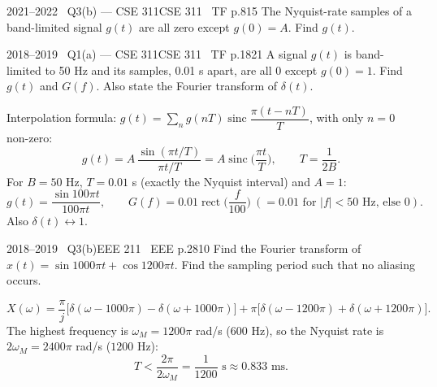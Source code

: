 \begin{qcard}{2021--2022 \textbullet\ Q3(b) --- CSE 311}{CSE 311 \textbullet\ TF p.8}{15}
The Nyquist-rate samples of a band-limited signal $g(t)$ are all zero except $g(0)=A$. Find $g(t)$.
\end{qcard}
\begin{qcard}{2018--2019 \textbullet\ Q1(a) --- CSE 311}{CSE 311 \textbullet\ TF p.18}{21}
A signal $g(t)$ is band-limited to 50 Hz and its samples, 0.01 s apart, are all 0 except $g(0)=1$. Find $g(t)$ and $G(f)$. Also state the Fourier transform of $\delta(t)$.
\end{qcard}
\begin{solution}
Interpolation formula: $g(t)=\sum_ng(nT)\operatorname{sinc}\dfrac{\pi(t-nT)}T$, with only $n=0$ non-zero:
\[g(t)=A\,\frac{\sin(\pi t/T)}{\pi t/T}=A\operatorname{sinc}\Big(\frac{\pi t}{T}\Big),\qquad T=\frac1{2B}.\]
For $B=50$ Hz, $T=0.01$ s (exactly the Nyquist interval) and $A=1$:
\[g(t)=\frac{\sin100\pi t}{100\pi t},\qquad G(f)=0.01\operatorname{rect}\Big(\frac f{100}\Big)\ (=0.01\text{ for }|f|<50\text{ Hz, else }0).\]
Also $\delta(t)\leftrightarrow1$.
\end{solution}

\begin{qcard}{2018--2019 \textbullet\ Q3(b)}{EEE 211 \textbullet\ EEE p.28}{10}
Find the Fourier transform of $x(t)=\sin1000\pi t+\cos1200\pi t$. Find the sampling period such that no aliasing occurs.
\end{qcard}
\begin{solution}
\[X(\omega)=\frac\pi j\big[\delta(\omega-1000\pi)-\delta(\omega+1000\pi)\big]+\pi\big[\delta(\omega-1200\pi)+\delta(\omega+1200\pi)\big].\]
The highest frequency is $\omega_M=1200\pi$ rad/s ($600$ Hz), so the Nyquist rate is $2\omega_M=2400\pi$ rad/s ($1200$ Hz):
\[T<\frac{2\pi}{2\omega_M}=\frac1{1200}\text{ s}\approx0.833\text{ ms}.\]
\end{solution}

